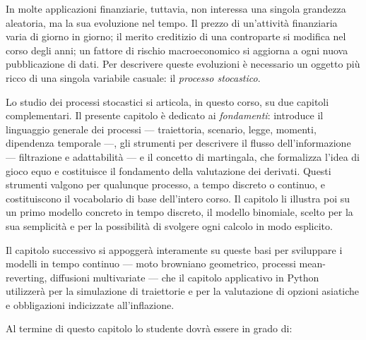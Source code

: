 In molte applicazioni finanziarie, tuttavia, non interessa una singola
grandezza aleatoria, ma la sua evoluzione nel tempo. Il prezzo di
un'attivit\`{a} finanziaria varia di giorno in giorno; il merito creditizio
di una controparte si modifica nel corso degli anni; un fattore di rischio
macroeconomico si aggiorna a ogni nuova pubblicazione di dati. Per descrivere
queste evoluzioni \`{e} necessario un oggetto pi\`{u} ricco di una singola
variabile casuale: il \emph{processo stocastico}.

Lo studio dei processi stocastici si articola, in questo corso, su due
capitoli complementari. Il presente capitolo \`{e} dedicato ai
\emph{fondamenti}: introduce il linguaggio generale dei processi ---
traiettoria, scenario, legge, momenti, dipendenza temporale ---, gli
strumenti per descrivere il flusso dell'informazione --- filtrazione e
adattabilit\`{a} --- e il concetto di martingala, che formalizza l'idea
di gioco equo e costituisce il fondamento della valutazione dei
derivati. Questi strumenti valgono per qualunque processo, a tempo
discreto o continuo, e costituiscono il vocabolario di base
dell'intero corso. Il capitolo li illustra poi su un primo modello
concreto in tempo discreto, il modello binomiale, scelto per la sua
semplicit\`{a} e per la possibilit\`{a} di svolgere ogni calcolo in
modo esplicito.
 
Il capitolo successivo si appogger\`{a} interamente su queste basi per
sviluppare i modelli in tempo continuo --- moto browniano geometrico,
processi mean-reverting, diffusioni multivariate --- che il capitolo applicativo in Python utilizzer\`{a} per la simulazione di traiettorie
e per la valutazione di opzioni asiatiche e obbligazioni indicizzate
all'inflazione.

Al termine di questo capitolo lo studente dovr\`{a} essere in grado di:
 
